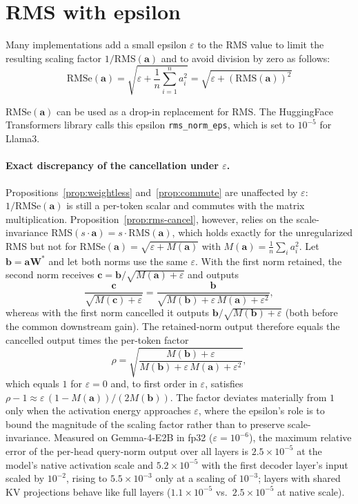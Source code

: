 \documentclass{article}
\def\rms{\text{RMS}(\mathbf{a})}      %
\def\f1n{\frac{1}{n}}                 %
\def\sas{\sum_{i=1}^n a_i^2}           %
\def\a{\mathbf{a}}                    %
\begin{document}
\section{RMS with epsilon}\label{app:epsilon}
Many implementations add a small epsilon $\varepsilon$ to the RMS value to limit the resulting scaling factor $1/\mathrm{RMS}(\mathbf{a})$ and to avoid division by zero as follows:
\begin{equation*}
 \text{RMSe}(\a) = \sqrt{\varepsilon + \f1n \sas} = \sqrt{\varepsilon + \left( \rms \right)^2}
\end{equation*}

$\text{RMSe}(\a)$ can be used as a drop-in replacement for RMS. The HuggingFace Transformers library calls this epsilon \verb+rms_norm_eps+, which is set to $10^{-5}$ for Llama3.

\paragraph{Exact discrepancy of the cancellation under $\varepsilon$.}
Propositions~\ref{prop:weightless} and~\ref{prop:commute} are unaffected by $\varepsilon$: $1/\mathrm{RMSe}(\mathbf{a})$ is still a per-token scalar and commutes with the matrix multiplication. Proposition~\ref{prop:rms-cancel}, however, relies on the scale-invariance $\mathrm{RMS}(s\cdot\mathbf{a}) = s\cdot\mathrm{RMS}(\mathbf{a})$, which holds exactly for the unregularized RMS but not for $\mathrm{RMSe}(\mathbf{a}) = \sqrt{\varepsilon + M(\mathbf{a})}$ with $M(\mathbf{a}) = \tfrac{1}{n}\sum_i a_i^2$. Let $\mathbf{b} = \mathbf{a}\mathbf{W}^*$ and let both norms use the same $\varepsilon$. With the first norm retained, the second norm receives $\mathbf{c} = \mathbf{b}/\sqrt{M(\mathbf{a})+\varepsilon}$ and outputs
\begin{equation*}
  \frac{\mathbf{c}}{\sqrt{M(\mathbf{c})+\varepsilon}}
  = \frac{\mathbf{b}}{\sqrt{M(\mathbf{b}) + \varepsilon\,M(\mathbf{a}) + \varepsilon^2}},
\end{equation*}
whereas with the first norm cancelled it outputs $\mathbf{b}/\sqrt{M(\mathbf{b})+\varepsilon}$ (both before the common downstream gain). The retained-norm output therefore equals the cancelled output times the per-token factor
\begin{equation*}
  \rho = \sqrt{\frac{M(\mathbf{b})+\varepsilon}{M(\mathbf{b}) + \varepsilon\,M(\mathbf{a}) + \varepsilon^2}},
\end{equation*}
which equals $1$ for $\varepsilon = 0$ and, to first order in $\varepsilon$, satisfies $\rho - 1 \approx \varepsilon\,(1 - M(\mathbf{a}))/(2M(\mathbf{b}))$. The factor deviates materially from $1$ only when the activation energy approaches $\varepsilon$, where the epsilon's role is to bound the magnitude of the scaling factor rather than to preserve scale-invariance. Measured on Gemma-4-E2B in fp32 ($\varepsilon = 10^{-6}$), the maximum relative error of the per-head query-norm output over all layers is $2.5\times10^{-5}$ at the model's native activation scale and $5.2\times10^{-5}$ with the first decoder layer's input scaled by $10^{-2}$, rising to $5.5\times10^{-3}$ only at a scaling of $10^{-3}$; layers with shared KV projections behave like full layers ($1.1\times10^{-5}$ vs.\ $2.5\times10^{-5}$ at native scale).
\end{document}
